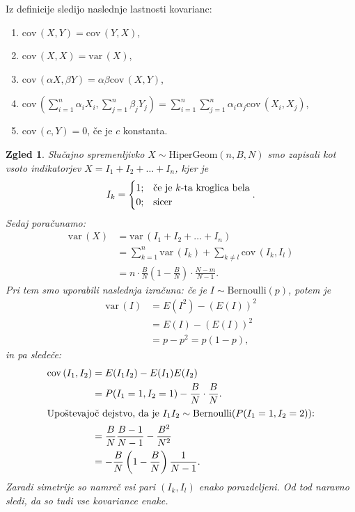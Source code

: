 \documentclass[10pt, a4paper]{article}
\newtheorem{zgled}[izr]{Zgled}
\newcommand{\vari}{\mathrm{var}\,}
\newcommand{\cov}{\mathrm{cov}\,}
\begin{document}
Iz definicije sledijo naslednje lastnosti kovarianc:
\begin{enumerate}
  \item $\cov(X, Y) = \cov(Y, X)$,
  \item $\cov(X, X) = \vari(X)$,
  \item $\cov(\alpha X, \beta Y) = \alpha \beta \cov(X, Y)$,
  \item $\cov\left(\sum_{i = 1} ^n \alpha_i X_i, \sum_{j = 1} ^n \beta_j Y_j\right) = \sum_{i = 1} ^n \sum_{j = 1} ^n \alpha_i \alpha_j \cov(X_i, X_j)$,
  \item $\cov(c, Y) = 0$, če je $c$ konstanta.
\end{enumerate}

\begin{zgled}
  Slučajno spremenljivko $X \sim \mathrm{HiperGeom} (n, B, N)$ smo zapisali kot vsoto indikatorjev 
  $X = I_1 + I_2 + \dots + I_n$, kjer je 
  $$I_k = \begin{cases}
    1;& \textup{če je $k$-ta kroglica bela}\\
    0;& \textup{sicer}
  \end{cases}.$$
  Sedaj poračunamo:
  \begin{align*}
    \vari(X) &= \vari(I_1 + I_2 + \dots + I_n)\\
    &= \sum_{k = 1} ^n \vari(I_k) + \sum_{k \neq l} \cov(I_k, I_l)\\
    &= n \cdot \frac{B}{N} \left(1 - \frac{B}{N}\right) \cdot \frac{N - m}{N - 1}.
  \end{align*}
  Pri tem smo uporabili naslednja izračuna: če je $I \sim \mathrm{Bernoulli}(p)$, potem je
  \begin{align*}
    \vari(I) &= E(I^2) - (E(I))^2\\
    &= E(I) - (E(I))^2\\
    &= p - p^2 = p(1 - p),
  \end{align*}
  in pa sledeče:
  \begin{align*}
    \cov(I_1, I_2) &= E(I_1 I_2) - E(I_1) E(I_2)\\
    &= P(I_1 = 1, I_2 = 1) - \frac{B}{N} \cdot \frac{B}{N}.\\
    \intertext{Upoštevajoč dejstvo, da je $I_1 I_2 \sim \mathrm{Bernoulli}(P(I_1 = 1, I_2 = 2))$:}
    &= \frac{B}{N} \frac{B - 1}{N - 1} - \frac{B^2}{N^2}\\
    &= -\frac{B}{N} \left(1 - \frac{B}{N}\right) \frac{1}{N - 1}.
  \end{align*}
  Zaradi simetrije so namreč vsi pari $(I_k, I_l)$ enako porazdeljeni.
  Od tod naravno sledi, da so tudi vse kovariance enake.
\end{zgled}
\end{document}
